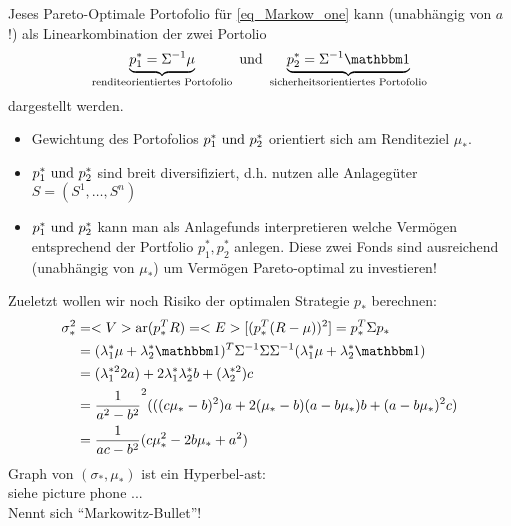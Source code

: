 \begin{conclusion}
	Jeses Pareto-Optimale Portofolio für \eqref{eq_Markow_one} kann (unabhängig von $a$!) als Linearkombination der zwei Portolio
	\begin{align*}
		\underbrace{p^{\ast}_1 = \Sigma^{-1}\mu}_{\text{renditeorientiertes Portofolio}} \und \underbrace{p_2^{\ast} = \Sigma^{-1}\indi}_{\text{sicherheitsorientiertes Portofolio}}
	\end{align*}
	dargestellt werden.
\end{conclusion}
\begin{*remark}
	\begin{itemize}
		\item Gewichtung des Portofolios $p^{\ast}_1 \text{ und } p_2^{\ast}$ orientiert sich am Renditeziel $\mu_{\ast}$.
		\item $p^{\ast}_1 \text{ und } p_2^{\ast}$ sind breit diversifiziert, d.h. nutzen alle Anlagegüter $S = (S^1, \dots, S^n)$
		\item $p^{\ast}_1 \text{ und } p_2^{\ast}$ kann man als Anlagefunds interpretieren welche Vermögen entsprechend der Portfolio $p^{\ast}_1, p^{\ast}_2$ anlegen. Diese zwei Fonds sind ausreichend (unabhängig von $\mu_{\ast}$) um Vermögen Pareto-optimal zu investieren!
	\end{itemize}
\end{*remark}
Zueletzt wollen wir noch Risiko der optimalen Strategie $p_{\ast}$ berechnen:
\begin{align*}
	\sigma_{\ast}^2 &= \Var(p_{\ast}^T R) = \E[(p_{\ast}^T (R-\mu))^2] = p_{\ast}^T \Sigma p_{\ast}\\
	&= (\lambda_1^{\ast}\mu + \lambda_2^{\ast}\indi)^T \Sigma^{-1}\Sigma\Sigma^{-1}(\lambda_1^{\ast}\mu + \lambda_2^{\ast}\indi)\\
	&= (\lambda_1^{\ast 2}2 a) + 2 \lambda_1^{\ast}\lambda_2^{\ast} b + (\lambda_2^{\ast 2})c\\
	&= \frac{1}{a^2-b^2}^2 (((c\mu_{\ast} -b)^2)a + 2(\mu_{\ast} - b)(a-b \mu_{\ast})b + (a - b\mu_{\ast})^2c)\\
	&= \frac{1}{ac-b^2}(c \mu_{\ast}^2 - 2b\mu_{\ast} +a^2)
\end{align*}
Graph von $(\sigma_{\ast}, \mu_{\ast})$ ist ein Hyperbel-ast:\\
siehe picture phone ...\\
Nennt sich ``Markowitz-Bullet''!
